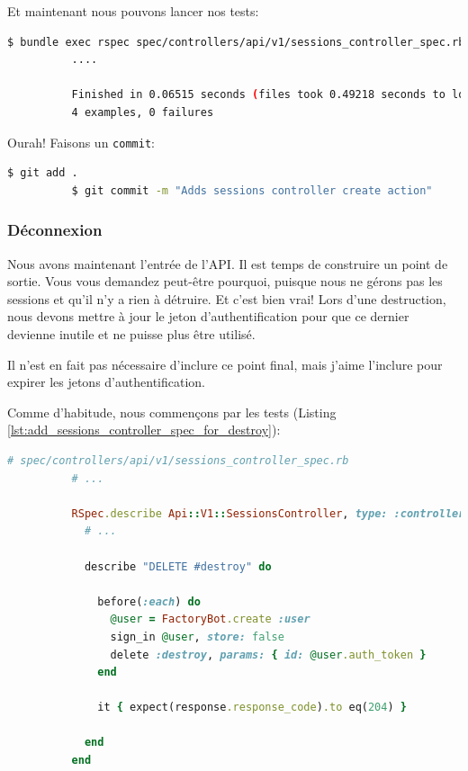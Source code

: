 \documentclass[]{report}
\begin{document}
        Et maintenant nous pouvons lancer nos tests:

        \begin{scriptsize}
          \begin{lstlisting}[language=bash]
          $ bundle exec rspec spec/controllers/api/v1/sessions_controller_spec.rb
          ....

          Finished in 0.06515 seconds (files took 0.49218 seconds to load)
          4 examples, 0 failures
          \end{lstlisting}
        \end{scriptsize}

        Ourah! Faisons un \verb|commit|:

        \begin{scriptsize}
          \begin{lstlisting}[language=bash]
          $ git add .
          $ git commit -m "Adds sessions controller create action"
          \end{lstlisting}
        \end{scriptsize}

      \subsubsection{Déconnexion}

        Nous avons maintenant l'entrée de l'API. Il est temps de construire un point de sortie. Vous vous demandez peut-être pourquoi, puisque nous ne gérons pas les sessions et qu'il n'y a rien à détruire. Et c'est bien vrai! Lors d'une destruction, nous devons mettre à jour le jeton d'authentification pour que ce dernier devienne inutile et ne puisse plus être utilisé.

        Il n'est en fait pas nécessaire d'inclure ce point final, mais j'aime l'inclure pour expirer les jetons d'authentification.

        Comme d'habitude, nous commençons par les tests (Listing \ref{lst:add_sessions_controller_spec_for_destroy}):

        \begin{scriptsize}
          \begin{lstlisting}[language=ruby, caption={Création des test de destruction des jetons d'authentification}, label={lst:add_sessions_controller_spec_for_destroy}]
          # spec/controllers/api/v1/sessions_controller_spec.rb
          # ...

          RSpec.describe Api::V1::SessionsController, type: :controller do
            # ...

            describe "DELETE #destroy" do

              before(:each) do
                @user = FactoryBot.create :user
                sign_in @user, store: false
                delete :destroy, params: { id: @user.auth_token }
              end

              it { expect(response.response_code).to eq(204) }

            end
          end
          \end{lstlisting}
        \end{scriptsize}
\end{document}
